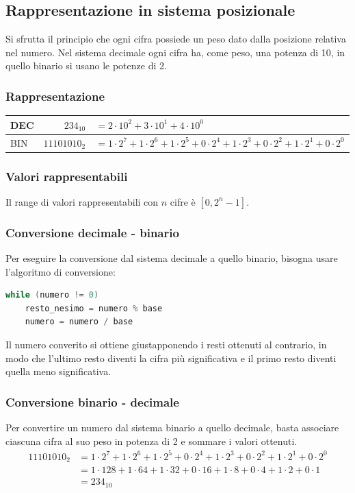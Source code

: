 \documentclass[a4paper]{article}
\begin{document}
\newpage


\subsection{Rappresentazione in sistema posizionale}
Si sfrutta il principio che ogni cifra possiede un peso dato dalla posizione relativa nel numero. Nel sistema decimale ogni
cifra ha, come peso, una potenza di 10, in quello binario si usano le potenze di 2.

\subsubsection*{Rappresentazione}
\begin{center}
	\begin{tabularx}{\textwidth}{l r X}
		DEC & \(234_{10}\) & \(= 2 \cdot 10 ^ 2 + 3 \cdot 10 ^ 1 + 4 \cdot 10 ^ 0 \) \\
		\midrule
		BIN & \(11101010_2\) & \(= 1 \cdot 2 ^ 7 + 1 \cdot 2 ^ 6 + 1 \cdot 2 ^ 5 + 0 \cdot 2 ^ 4 + 1 \cdot 2 ^ 3 + 0 \cdot 2 ^ 2 + 1 \cdot 2 ^ 1 + 0 \cdot 2 ^ 0\)
	\end{tabularx}
\end{center}

\subsubsection*{Valori rappresentabili}
Il range di valori rappresentabili con \(n\) cifre è \(\left[ 0, 2^n - 1 \right]\).

\subsubsection*{Conversione decimale - binario}
Per eseguire la conversione dal sistema decimale a quello binario, bisogna usare l'algoritmo di conversione:
\begin{lstlisting}[language=Java]
while (numero != 0)
	resto_nesimo = numero % base
	numero = numero / base
\end{lstlisting}

Il numero converito si ottiene giustapponendo i resti ottenuti al contrario, in modo che l'ultimo resto diventi la cifra più
significativa e il primo resto diventi quella meno significativa.

\subsubsection*{Conversione binario - decimale}
Per convertire un numero dal sistema binario a quello decimale, basta associare ciascuna cifra al suo peso in potenza
di 2 e sommare i valori ottenuti.
\begin{align*}
	11101010_2 &=  1 \cdot 2 ^ 7 + 1 \cdot 2 ^ 6 + 1 \cdot 2 ^ 5 + 0 \cdot 2 ^ 4 + 1 \cdot 2 ^ 3 + 0 \cdot 2 ^ 2 + 1 \cdot 2 ^ 1 + 0 \cdot 2 ^ 0 \\
	&=  1 \cdot 128 + 1 \cdot 64 + 1 \cdot 32 + 0 \cdot 16 + 1 \cdot 8 + 0 \cdot 4 + 1 \cdot 2 + 0 \cdot 1 \\
	&= 234_{10}
\end{align*}
\end{document}
